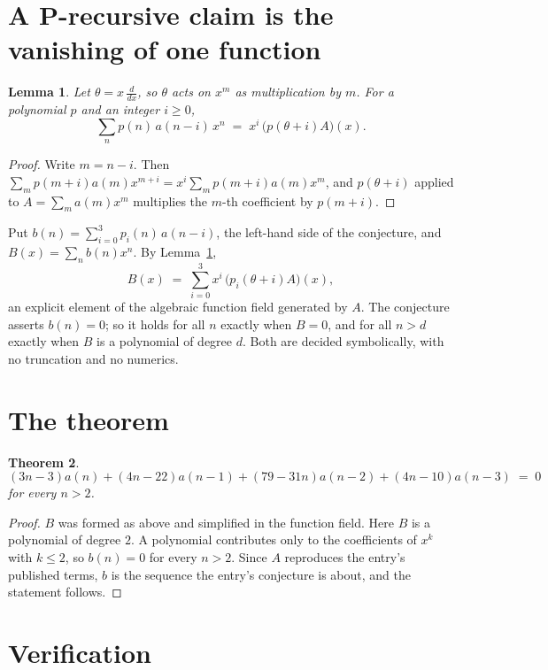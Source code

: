 \documentclass[11pt,a4paper]{article}
\theoremstyle{plain}
\newtheorem{theorem}{Theorem}
\newtheorem{lemma}[theorem]{Lemma}
\theoremstyle{definition}
\begin{document}
\section{A P-recursive claim is the vanishing of one function}

\begin{lemma}\label{lem:theta}
Let $\theta=x\,\frac{d}{dx}$, so $\theta$ acts on $x^m$ as multiplication by $m$. For a
polynomial $p$ and an integer $i\ge0$,
\[
\sum_{n} p(n)\,a(n-i)\,x^{n}\;=\;x^{i}\,\bigl(p(\theta+i)A\bigr)(x).
\]
\end{lemma}

\begin{proof}
Write $m=n-i$. Then $\sum_m p(m+i)a(m)x^{m+i}=x^i\sum_m p(m+i)a(m)x^m$, and $p(\theta+i)$
applied to $A=\sum_m a(m)x^m$ multiplies the $m$-th coefficient by $p(m+i)$.
\end{proof}

Put $b(n)=\sum_{i=0}^{3}p_i(n)\,a(n-i)$, the left-hand side of the conjecture, and
$B(x)=\sum_n b(n)x^n$. By Lemma~\ref{lem:theta},
\[
B(x)\;=\;\sum_{i=0}^{3}x^{i}\,\bigl(p_i(\theta+i)A\bigr)(x),
\]
an explicit element of the algebraic function field generated by $A$. The conjecture asserts
$b(n)=0$; so it holds for all $n$ exactly when $B=0$, and for all $n>d$ exactly when $B$ is a
polynomial of degree $d$. Both are decided symbolically, with no truncation and no numerics.

\section{The theorem}

\begin{theorem}
\[
\left(3 n - 3\right)a(n) + \left(4 n - 22\right)a(n-1) + \left(79 - 31 n\right)a(n-2) + \left(4 n - 10\right)a(n-3)\;=\;0
\]
for every $n>2$.
\end{theorem}

\begin{proof}
$B$ was formed as above and simplified in the function field. Here $B$ is a polynomial of degree $2$. A polynomial contributes only to the coefficients of $x^k$ with $k\le2$, so $b(n)=0$ for every $n>2$. Since $A$ reproduces the
entry's published terms, $b$ is the sequence the entry's conjecture is about, and the statement
follows.
\end{proof}

\section{Verification}
\end{document}
